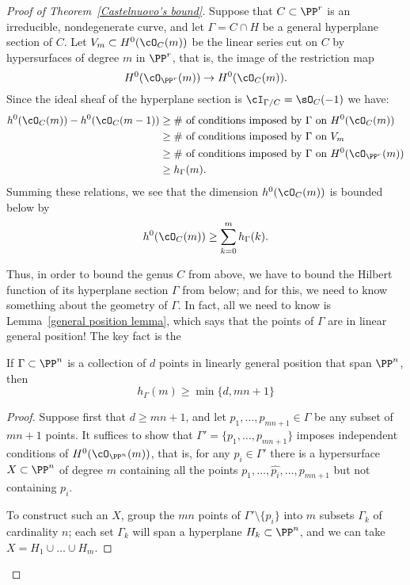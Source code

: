 \begin{proof}[Proof of Theorem~\ref{Castelnuovo's bound}]
Suppose that $C \subset \PP^r$ is an irreducible, nondegenerate curve, and let $\Gamma = C \cap H$ be a general hyperplane section of $C$. Let $V_m \subset H^0(\cO_C(m))$ be the linear series cut on $C$ by hypersurfaces of degree $m$ in $\PP^r$, that is, the image of the restriction map
$$
H^0(\cO_{\PP^r}(m)) \to H^0(\cO_C(m)).
$$
Since the ideal sheaf of the hyperplane section is $\cI_{\Gamma/C} = \sO_C(-1)$ we have:
\begin{align*}
h^0(\cO_C(m)) - h^0(\cO_C(m-1)) & \geq \text{\# of conditions imposed by $\Gamma$ on $H^0(\cO_C(m))$} \\
&\geq \text{\# of conditions imposed by $\Gamma$ on $V_m$} \\
&\geq \text{\# of conditions imposed by $\Gamma$ on $H^0(\cO_{\PP^r}(m))$} \\
&\geq h_\Gamma(m).
\end{align*}
Summing these relations, we see that the dimension $h^0(\cO_C(m))$ is bounded below by
$$
h^0(\cO_C(m)) \geq \sum_{k=0}^m h_\Gamma(k).
$$

Thus, in order to bound the genus $C$ from above, we have to bound the Hilbert function of its hyperplane section $\Gamma$  from below; and for this, we need to know something about the geometry of $\Gamma$. In fact, all we need to know is Lemma~\ref{general position lemma}, which says that the points of $\Gamma$ are in linear general position! The key fact is the

\begin{proposition}\label{min hilb}
If $\Gamma \subset \PP^n$ is a collection of $d$ points in linearly general position that span $\PP^n$, then 
$$
h_\Gamma(m) \geq \min\{d, mn+1\}
$$
\end{proposition}

\begin{proof}
Suppose first that $d \geq mn+1$, and let $p_1,\dots,p_{mn+1} \in \Gamma$ be any subset of $mn+1$ points. It suffices to show that $\Gamma' = \{p_1,\dots,p_{mn+1}\}$ imposes independent conditions of $H^0(\cO_{\PP^n}(m))$, that is, for any $p_i \in \Gamma'$ there is a hypersurface $X \subset \PP^n$ of degree $m$ containing all the points $p_1,\dots, \hat{p_i},\dots,p_{mn+1}$ but not containing $p_i$.

To construct such an $X$, group the $mn$ points of $\Gamma' \setminus \{p_i\}$ into $m$ subsets $\Gamma_k$ of cardinality $n$; each set $\Gamma_k$ will span a hyperplane $H_k \subset \PP^n$, and we can take $X = H_1 \cup \dots \cup H_m$. 


\end{proof}
\end{proof}
